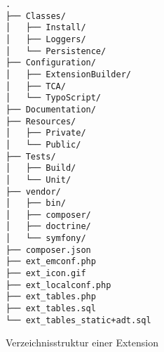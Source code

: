 \begin{figure}[t]
\begin{Verbatim}[samepage=true]
.
├── Classes/
│   ├── Install/
│   ├── Loggers/
│   └── Persistence/
├── Configuration/
│   ├── ExtensionBuilder/
│   ├── TCA/
│   └── TypoScript/
├── Documentation/
├── Resources/
│   ├── Private/
│   └── Public/
├── Tests/
│   ├── Build/
│   └── Unit/
├── vendor/
│   ├── bin/
│   ├── composer/
│   ├── doctrine/
│   └── symfony/
├── composer.json
├── ext_emconf.php
├── ext_icon.gif
├── ext_localconf.php
├── ext_tables.php
├── ext_tables.sql
└── ext_tables_static+adt.sql
\end{Verbatim}
\caption{Verzeichnisstruktur einer Extension}
\label{pic:extensionFolderStructure}
\end{figure}
\pagebreak
